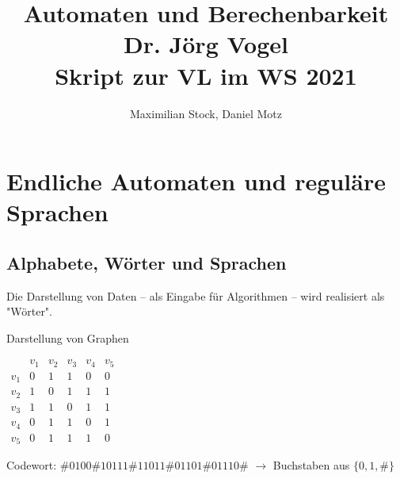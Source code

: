\documentclass[runningheads]{llncs}
\begin{document}
%
\title{
    Automaten und Berechenbarkeit \\
    Dr. Jörg Vogel \\
    Skript zur VL im WS 2021
}
%
%
\author{Maximilian Stock, Daniel Motz}
%
%
%
\maketitle %
%

\section{Endliche Automaten und reguläre Sprachen}

\subsection{Alphabete, Wörter und Sprachen}

Die Darstellung von Daten -- als Eingabe für Algorithmen -- wird realisiert als "Wörter".

\begin{example}
    Darstellung von Graphen

    \begin{minipage}{.5\textwidth}
    \end{minipage} %
    \begin{minipage}{.5\textwidth}
        $\begin{matrix}
            & v_1 & v_2 & v_3 & v_4 & v_5 \\
        v_1 & 0 & 1 & 1 & 0 & 0 \\
        v_2 & 1 & 0 & 1 & 1 & 1 \\
        v_3 & 1 & 1 & 0 & 1 & 1 \\
        v_4 & 0 & 1 & 1 & 0 & 1 \\
        v_5 & 0 & 1 & 1 & 1 & 0
        \end{matrix}$
    \end{minipage}%
    \newline%
    \newline%
    Codewort: $\#0100\#10111\#11011\#01101\#01110\#$
    $\rightarrow$ Buchstaben aus $\{0, 1, \#\}$
\end{example}
\end{document}
